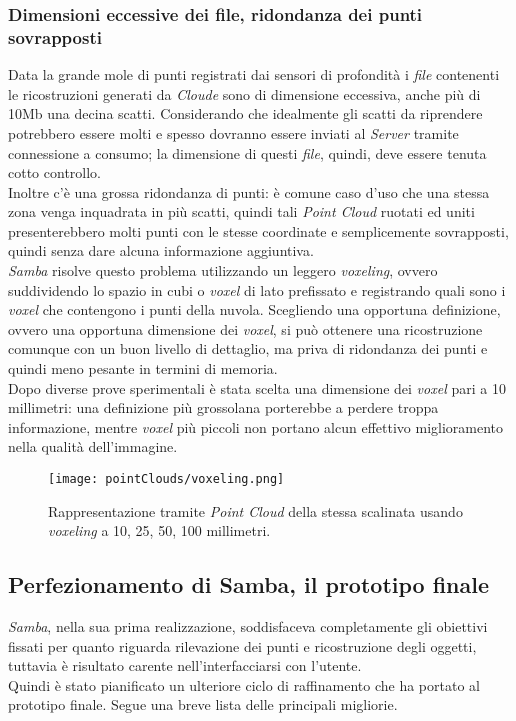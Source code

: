\subsubsection{Dimensioni eccessive dei file, ridondanza dei punti sovrapposti}
Data la grande mole di punti registrati dai sensori di profondità i \emph{file} contenenti le ricostruzioni generati da \emph{Cloude} sono di dimensione eccessiva, anche più di 10Mb una decina scatti.
Considerando che idealmente gli scatti da riprendere potrebbero essere molti e spesso dovranno essere inviati al \emph{Server} tramite connessione a consumo; la dimensione di questi \emph{file}, quindi, deve essere tenuta cotto controllo.\\
Inoltre c'è una grossa ridondanza di punti: è comune caso d'uso che una stessa zona venga inquadrata in più scatti, quindi tali \emph{Point Cloud} ruotati ed uniti presenterebbero molti punti con le stesse coordinate e semplicemente sovrapposti, quindi senza dare alcuna informazione aggiuntiva.\\
\emph{Samba} risolve questo problema utilizzando un leggero \emph{voxeling}, ovvero suddividendo lo spazio in cubi o \emph{voxel} di lato prefissato e registrando quali sono i \emph{voxel} che contengono i punti della nuvola.
Scegliendo una opportuna definizione, ovvero una opportuna dimensione dei \emph{voxel}, si può ottenere una ricostruzione comunque con un buon livello di dettaglio, ma priva di ridondanza dei punti e quindi meno pesante in termini di memoria.\\
Dopo diverse prove sperimentali è stata scelta una dimensione dei \emph{voxel} pari a 10 millimetri: una definizione più grossolana porterebbe a perdere troppa informazione, mentre \emph{voxel} più piccoli non portano alcun effettivo miglioramento nella qualità dell'immagine.
\begin{figure}[!h] 
    \centering 
    \texttt{[image: pointClouds/voxeling.png]} 
    \caption{Rappresentazione tramite \emph{Point Cloud} della stessa scalinata usando \emph{voxeling} a 10, 25, 50, 100 millimetri.}
\end{figure}

\subsection{Perfezionamento di Samba, il prototipo finale}
\emph{Samba}, nella sua prima realizzazione, soddisfaceva completamente gli obiettivi fissati per quanto riguarda rilevazione dei punti e ricostruzione degli oggetti, tuttavia è risultato carente nell'interfacciarsi con l'utente.\\
Quindi è stato pianificato un ulteriore ciclo di raffinamento che ha portato al prototipo finale. Segue una breve lista delle principali migliorie.

